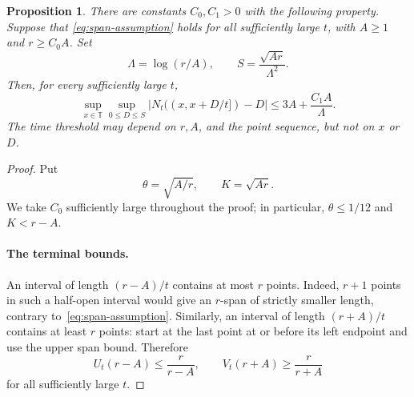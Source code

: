 \documentclass[10pt,a4paper]{amsart}
\newtheorem{proposition}{Proposition}
\newcommand{\T}{\mathbb{T}}
\begin{document}
\begin{proposition}\label{prop:short}
There are constants $C_0,C_1>0$ with the following property. Suppose that
\eqref{eq:span-assumption} holds for all sufficiently large $t$, with
$A\geq1$ and $r\geq C_0A$. Set
\[
  \Lambda=\log(r/A),
  \qquad
  S=\frac{\sqrt{Ar}}{\Lambda^2}.
\]
Then, for every sufficiently large $t$,
\begin{equation}\label{eq:short-count}
  \sup_{x\in\T}\sup_{0\leq D\leq S}
  \left|N_t((x,x+D/t])-D\right|
  \leq3A+\frac{C_1A}{\Lambda}.
\end{equation}
The time threshold may depend on $r,A$, and the point sequence, but not
on $x$ or $D$.
\end{proposition}

\begin{proof}
Put
\[
  \theta=\sqrt{A/r},
  \qquad
  K=\sqrt{Ar}.
\]
We take $C_0$ sufficiently large throughout the proof; in particular,
$\theta\leq1/12$ and $K<r-A$.
\paragraph{The terminal bounds.}
An interval of length $(r-A)/t$ contains at most $r$ points. Indeed,
$r+1$ points in such a half-open interval would give an $r$-span of
strictly smaller length, contrary to~\eqref{eq:span-assumption}. Similarly,
an interval of length $(r+A)/t$ contains at least $r$ points: start at the
last point at or before its left endpoint and use the upper span bound.
Therefore
\begin{equation}\label{eq:terminal}
  U_t(r-A)\leq\frac r{r-A},
  \qquad
  V_t(r+A)\geq\frac r{r+A}
\end{equation}
for all sufficiently large $t$.

\end{proof}
\end{document}
